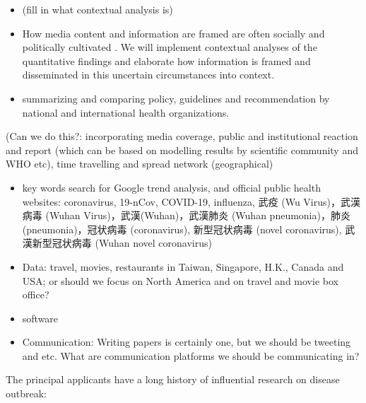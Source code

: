 
\begin{itemize}
\item{(fill in what contextual analysis is)}
\item{How media content and information are framed are often socially and politically cultivated \citep{}. We will implement contextual analyses of the quantitative findings and elaborate how information is framed and disseminated in this uncertain circumstances into context.}
\item{summarizing and comparing policy, guidelines and recommendation by national and international health organizations.}
\end{itemize}

(Can we do this?: incorporating media coverage, public and institutional reaction and report (which can be based on modelling results by scientific community and WHO etc), time travelling and spread network (geographical)

\begin{itemize}
\item{key words search for Google trend analysis, and official public health websites: coronavirus, 19-nCov, COVID-19, influenza, 武疫 (Wu Virus)，武漢病毒 (Wuhan Virus)，武漢(Wuhan)，武漢肺炎 (Wuhan pneumonia)，肺炎 (pneumonia)，冠状病毒 (coronavirus), 新型冠状病毒 (novel coronavirus), 武漢新型冠状病毒 (Wuhan novel coronavirus)}
\end{itemize}

\begin{itemize}
\item{Data: travel, movies, restaurants in Taiwan, Singapore, H.K., Canada and USA; or should we focus on North America and on travel and movie box office?}
\end{itemize}


\begin{itemize}
\item{software}
\item{Communication: Writing papers is certainly one, but we should be tweeting and etc. What are communication platforms we should be communicating in?}
\end{itemize}



The principal applicants have a long history of influential research on disease outbreak: 

